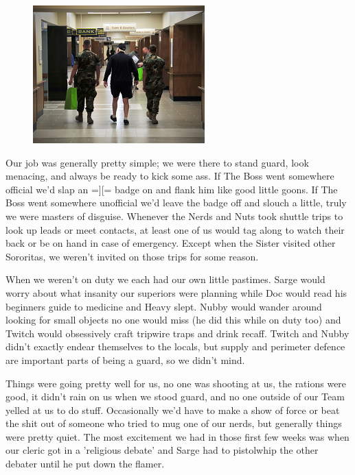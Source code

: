\begin{figure}
	\begin{center}
		\includegraphics[width=\figwidth]{pics/2/6.png}
	\end{center}
\end{figure}
Our job was generally pretty simple; we were there to stand guard, look menacing, and always be ready to kick some ass. 
If The Boss went somewhere official we'd slap an =][= badge on and flank him like good little goons. 
If The Boss went somewhere unofficial we'd leave the badge off and slouch a little, truly we were masters of disguise. 
Whenever the Nerds and Nuts took shuttle trips to look up leads or meet contacts, at least one of us would tag along to watch their back or be on hand in case of emergency. 
Except when the Sister visited other Sororitas, we weren't invited on those trips for some reason. 

When we weren't on duty we each had our own little pastimes. 
Sarge would worry about what insanity our superiors were planning while Doc would read his beginners guide to medicine and Heavy slept. 
Nubby would wander around looking for small objects no one would miss (he did this while on duty too) and Twitch would obsessively craft tripwire traps and drink recaff. 
Twitch and Nubby didn't exactly endear themselves to the locals, but supply and perimeter defence are important parts of being a guard, so we didn't mind.

Things were going pretty well for us, no one was shooting at us, the rations were good, it didn't rain on us when we stood guard, and no one outside of our Team yelled at us to do stuff.
Occasionally we'd have to make a show of force or beat the shit out of someone who tried to mug one of our nerds, but generally things were pretty quiet.
The most excitement we had in those first few weeks was when our cleric got in a 'religious debate' and Sarge had to pistolwhip the other debater until he put down the flamer.

